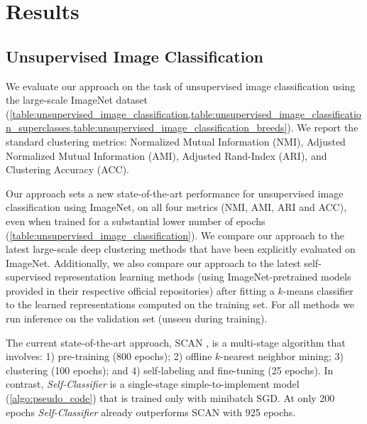 \documentclass[runningheads]{llncs}
\begin{document}
\section{Results}
\label{section:experiments} 
\subsection{Unsupervised Image Classification}
\label{section:unsupervised_image_classification}
We evaluate our approach on the task of unsupervised image classification using the large-scale ImageNet dataset (\cref{table:unsupervised_image_classification,table:unsupervised_image_classification_superclasses,table:unsupervised_image_classification_breeds}). We report the standard clustering metrics: Normalized Mutual Information (NMI), Adjusted Normalized Mutual Information (AMI), Adjusted Rand-Index (ARI), and Clustering Accuracy (ACC).  

Our approach sets a new state-of-the-art performance for unsupervised image classification using ImageNet, on all four metrics (NMI, AMI, ARI and ACC), even when trained for a substantial lower number of epochs (\cref{table:unsupervised_image_classification}). We compare our approach to the latest large-scale deep clustering methods \cite{YM.2020Self-labelling,van2020scan} that have been explicitly evaluated on ImageNet. Additionally, we also compare our approach to the latest self-supervised representation learning methods (using ImageNet-pretrained models provided in their respective official repositories) after fitting a $k$-means classifier to the learned representations computed on the training set. For all methods we run inference on the validation set (unseen during training). 

The current state-of-the-art approach, SCAN \cite{van2020scan}, is a multi-stage algorithm that involves: 1) pre-training (800 epochs); 2) offline $k$-nearest neighbor mining; 3) clustering (100 epochs); and 4) self-labeling and fine-tuning (25 epochs). In contrast, \textit{Self-Classifier} is a single-stage simple-to-implement model (\cref{algo:pseudo_code}) that is trained only with minibatch SGD. At only 200 epochs \textit{Self-Classifier} already outperforms SCAN with 925 epochs.
\end{document}
